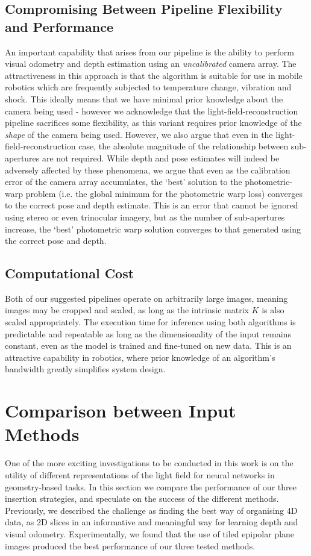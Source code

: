 \subsection{Compromising Between Pipeline Flexibility and Performance}
An important capability that arises from our pipeline is the ability to perform visual odometry and depth estimation using an \textit{uncalibrated} camera array. The attractiveness in this approach is that the algorithm is suitable for use in mobile robotics which are frequently subjected to temperature change, vibration and shock. This ideally means that we have minimal prior knowledge about the camera being used - however we acknowledge that the light-field-reconstruction pipeline sacrifices some flexibility, as this variant requires prior knowledge of the \textit{shape} of the camera being used. However, we also argue that even in the light-field-reconstruction case, the absolute magnitude of the relationship between sub-apertures are not required. While depth and pose estimates will indeed be adversely affected by these phenomena, we argue that even as the calibration error of the camera array accumulates, the `best' solution to the photometric-warp problem (i.e. the global minimum for the photometric warp loss) converges to the correct pose and depth estimate. This is an error that cannot be ignored using stereo or even trinocular imagery, but as the number of sub-apertures increase, the `best' photometric warp solution converges to that generated using the correct pose and depth. 

\subsection{Computational Cost}
Both of our suggested pipelines operate on arbitrarily large images, meaning images may be cropped and scaled, as long as the intrinsic matrix $K$ is also scaled appropriately. The execution time for inference using both algorithms is predictable and repeatable as long as the dimensionality of the input remains constant, even as the model is trained and fine-tuned on new data. This is an attractive capability in robotics, where prior knowledge of an algorithm's bandwidth greatly simplifies system design. 


\section{Comparison between Input Methods}
One of the more exciting investigations to be conducted in this work is on the utility of different representations of the light field for neural networks in geometry-based tasks. In this section we compare the performance of our three insertion strategies, and speculate on the success of the different methods. Previously, we described the challenge as finding the best way of organising 4D data, as 2D slices in an informative and meaningful way for learning depth and visual odometry. Experimentally, we found that the use of tiled epipolar plane images produced the best performance of our three tested methods.

